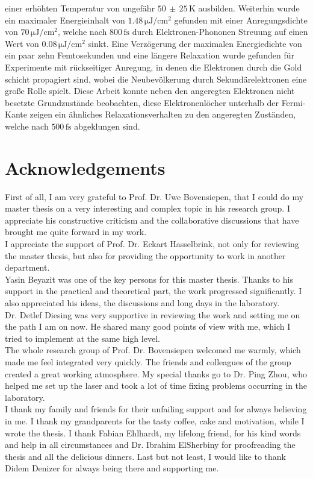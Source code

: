 \documentclass[a4paper,12pt,twoside]{article}
\begin{document}
einer erhöhten Temperatur von ungefähr $50\,\pm\,25\,\mathrm{K}$ ausbilden. Weiterhin wurde ein maximaler Energieinhalt von $1.48\,\mathrm{\mu J/cm^2}$ gefunden mit einer Anregungsdichte von $70\,\mathrm{\mu J/cm^2}$, welche nach $800\,\mathrm{fs}$ durch Elektronen-Phononen Streuung auf einen Wert von $0.08\,\mathrm{\mu J/cm^2}$ sinkt. Eine Verzögerung der maximalen Energiedichte von ein paar zehn Femtosekunden und eine längere Relaxation wurde gefunden für Experimente mit rückseitiger Anregung, in denen die Elektronen durch die Gold schicht propagiert sind, wobei die Neubevölkerung durch Sekundärelektronen eine große Rolle spielt. Diese Arbeit konnte neben den angeregten Elektronen nicht besetzte Grundzustände beobachten, diese Elektronenlöcher unterhalb der Fermi-Kante zeigen ein ähnliches Relaxationsverhalten zu den angeregten Zuständen, welche nach $500\,\mathrm{fs}$ abgeklungen sind.
\newpage
    \section*{Acknowledgements}
First of all, I am very grateful to Prof. Dr. Uwe Bovensiepen, that I could do my master thesis on a very interesting and complex topic in his research group. I appreciate his constructive criticism and the collaborative discussions that have brought me quite forward in my work.\\ 
I appreciate the support of Prof. Dr. Eckart Hasselbrink, not only for reviewing the master thesis, but also for providing the opportunity to work in another department.\\
Yasin Beyazit was one of the key persons for this master thesis. Thanks to his support in the practical and theoretical part, the work progressed significantly. I also appreciated his ideas, the discussions and long days in the laboratory.\\
Dr. Detlef Diesing was very supportive in reviewing the work and setting me on the path I am on now. He shared many good points of view with me, which I tried to implement at the same high level.\\
The whole research group of Prof. Dr. Bovensiepen welcomed me warmly, which made me feel integrated very quickly. The friends and colleagues of the group created a great working atmosphere. My special thanks go to Dr. Ping Zhou, who helped me set up the laser and took a lot of time fixing problems occurring in the laboratory.\\
I thank my family and friends for their unfailing support and for always believing in me. I thank my grandparents for the tasty coffee, cake and motivation, while I wrote the thesis. I thank Fabian Ehlhardt, my lifelong friend, for his kind words and help in all circumstances and Dr. Ibrahim ElSherbiny for proofreading the thesis and all the delicious dinners. Last but not least, I would like to thank Didem Denizer for always being there and supporting me.
\renewcommand{\baselinestretch}{1.0}\normalsize
\newpage
\end{document}
